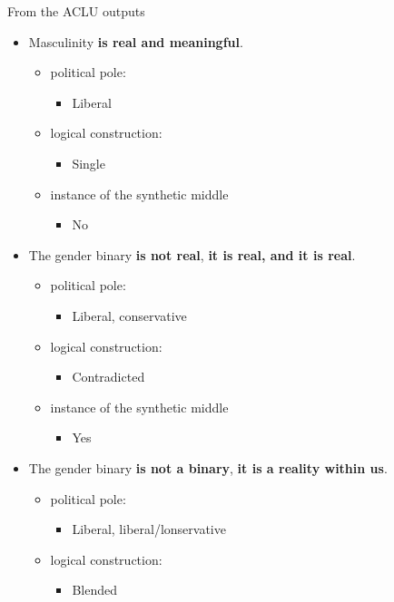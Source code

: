\documentclass[11pt]{article}
\begin{document}
From the ACLU outputs
\begin{itemize}
\item Masculinity \textbf{\textbf{is real and meaningful}}.
\begin{itemize}
\item political pole:
\begin{itemize}
\item Liberal
\end{itemize}
\item logical construction:
\begin{itemize}
\item Single
\end{itemize}
\item instance of the synthetic middle
\begin{itemize}
\item No
\end{itemize}
\end{itemize}
\item The gender binary \textbf{\textbf{is not real}}, \textbf{it is real, and it is real}.
\begin{itemize}
\item political pole:
\begin{itemize}
\item Liberal, conservative
\end{itemize}
\item logical construction:
\begin{itemize}
\item Contradicted
\end{itemize}
\item instance of the synthetic middle
\begin{itemize}
\item Yes
\end{itemize}
\end{itemize}
\item The gender binary \textbf{\textbf{is not a binary}}, \textbf{\textbf{\textbf{it is a reality within
us}}}.
\begin{itemize}
\item political pole:
\begin{itemize}
\item Liberal, liberal/lonservative
\end{itemize}
\item logical construction:
\begin{itemize}
\item Blended
\end{itemize}

\end{itemize}
\end{itemize}
\end{document}
